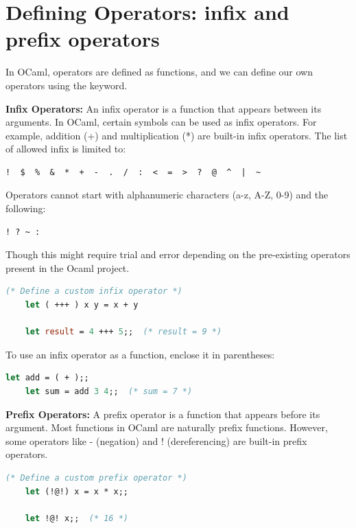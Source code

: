 \newpage 
\section{Defining Operators: infix and prefix operators}

In OCaml, operators are defined as functions, and we can define our own operators using the  keyword.
\begin{Def}

    \noindent
    \textbf{Infix Operators:} An infix operator is a function that appears between its arguments. In OCaml, certain symbols can be used as infix operators. For example, addition (+) and multiplication (*) are built-in infix operators.
    The list of allowed infix is limited to: 
    \begin{lstlisting}[language=OCaml, numbers=none]
        !  $  %  &  *  +  -  .  /  :  <  =  >  ?  @  ^  |  ~ 
    \end{lstlisting}
    \noindent
    Operators cannot start with alphanumeric characters (a-z, A-Z, 0-9) and the following:
    \begin{lstlisting}[language=OCaml, numbers=none]
        ! ? ~ : 
    \end{lstlisting}

    \noindent
    Though this might require trial and error depending on the pre-existing operators present in the Ocaml project.
    
    \begin{lstlisting}[language=OCaml, caption={Defining an Infix Operator}, numbers=none]
    (* Define a custom infix operator *)
    let ( +++ ) x y = x + y
    
    let result = 4 +++ 5;;  (* result = 9 *)
    \end{lstlisting}
    
    \noindent
    To use an infix operator as a function, enclose it in parentheses:
    
    \begin{lstlisting}[language=OCaml, numbers=none]
    let add = ( + );;
    let sum = add 3 4;;  (* sum = 7 *)
    \end{lstlisting}
    
    \noindent
    \textbf{Prefix Operators:} A prefix operator is a function that appears before its argument. Most functions in OCaml are naturally prefix functions. However, some operators like - (negation) and ! (dereferencing) are built-in prefix operators.
    
    \begin{lstlisting}[language=OCaml, caption={Defining a Prefix Operator}, numbers=none]
    (* Define a custom prefix operator *)
    let (!@!) x = x * x;;
    
    let !@! x;;  (* 16 *)
    \end{lstlisting}
    
    \end{Def}

